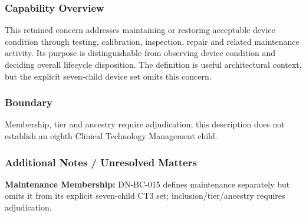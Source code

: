 \subsubsection*{Capability Overview}

This retained concern addresses maintaining or restoring acceptable device condition through testing, calibration, inspection, repair and related maintenance activity. Its purpose is distinguishable from observing device condition and deciding overall lifecycle disposition. The definition is useful architectural context, but the explicit seven-child device set omits this concern.

\subsubsection*{Boundary}

Membership, tier and ancestry require adjudication; this description does not establish an eighth Clinical Technology Management child.

\subsubsection*{Additional Notes / Unresolved Matters}
\textbf{Maintenance Membership:} DN-BC-015 defines maintenance separately but omits it from its explicit seven-child CT3 set; inclusion/tier/ancestry requires adjudication.

